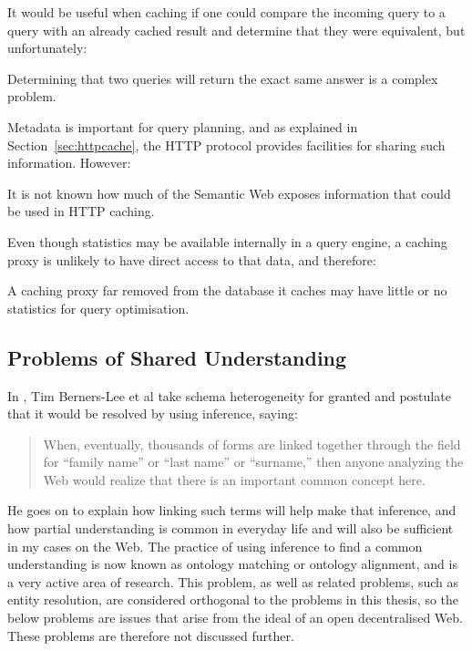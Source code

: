 It would be useful when caching if one could compare the incoming
query to a query with an already cached result and determine that they
were equivalent, but unfortunately:
\begin{problem}\label{prob:queryeq}
Determining that two queries will return the exact same answer is a
complex problem.
\end{problem}


Metadata is important for query planning, and as explained in
Section~\ref{sec:httpcache}, the HTTP protocol provides facilities for
sharing such information. However:
\begin{problem}\label{prob:sanity}
It is not known how much of the Semantic Web exposes information that
could be used in HTTP caching.
\end{problem}


Even though statistics may be available internally in a query engine,
a caching proxy is unlikely to have direct access to that data, and therefore:
\begin{problem}\label{prob:nostats}
A caching proxy far removed from the database it caches may have
little or no statistics for query optimisation.
\end{problem}


\subsection{Problems of Shared Understanding}\label{sec:semproblems}

In \cite{berners2000weaving}, Tim Berners-Lee et al take schema
heterogeneity for granted and postulate that it would be resolved by using
inference, saying:

\begin{quote}
When, eventually, thousands of forms are linked together through the
field for ``family name'' or ``last name'' or ``surname,'' then anyone
analyzing the Web would realize that there is an important common
concept here.
\end{quote}

He goes on to explain how linking such terms will help make
that inference, and how partial understanding is common in everyday
life and will also be sufficient in my cases on the Web. The practice
of using inference to find a common understanding is now known as
ontology matching or ontology alignment, and is a very active area of
research. This problem, as well as related problems, such as entity
resolution, are considered orthogonal to the problems in this thesis,
so the below problems are issues that arise from the ideal of an open
decentralised Web. These problems are therefore not discussed further.

